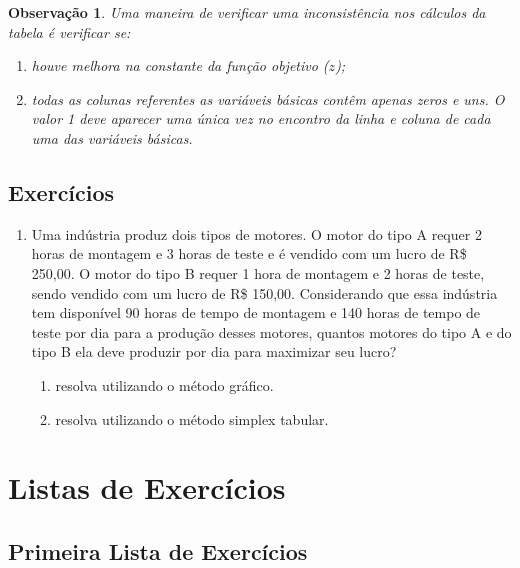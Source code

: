 \documentclass[
	12pt,				%
	openright,			%
	twoside,			%
	a4paper,			%
	english,			%
	french,				%
	brazil,				%
	sumario=tradicional
]{abntex2}
\newtheorem{remark}{Observação}
\numberwithin{example}{chapter}
\numberwithin{remark}{chapter}
\numberwithin{definition}{chapter}
\numberwithin{figure}{chapter}
\begin{document}
\begin{remark}
    Uma maneira de verificar uma inconsistência nos cálculos da tabela é verificar se:
    \begin{enumerate}
        \item houve melhora na constante da função objetivo ($z$);
        \item todas as colunas referentes as variáveis básicas contêm apenas zeros e uns. O valor 1 deve aparecer uma única vez no encontro da linha e coluna de cada uma das variáveis básicas.
    \end{enumerate}
\end{remark}

\section{Exercícios}

\begin{enumerate}
	\item Uma indústria produz dois tipos de motores. O motor do tipo A requer 2 horas de montagem e 3 horas de teste e é vendido com um lucro de R\$ 250,00. O motor do tipo B requer 1 hora de montagem e 2 horas de teste, sendo vendido com um lucro de R\$ 150,00. Considerando que essa indústria tem disponível 90 horas de tempo de montagem e 140 horas de tempo de teste por dia para a produção desses motores, quantos motores do tipo A e do tipo B ela deve produzir por dia para maximizar seu lucro?
	\begin{enumerate}
	    \item resolva utilizando o método gráfico.
	
	    \item resolva utilizando o método simplex tabular.
	\end{enumerate}
\end{enumerate}

\chapter{Listas de Exercícios}

\section{Primeira Lista de Exercícios}
\end{document}
